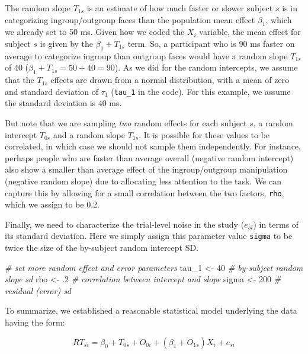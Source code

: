 \documentclass[english,doc,floatsintext]{apa6}
\newenvironment{Shaded}{\begin{snugshade}}{\end{snugshade}}
\newcommand{\CommentTok}[1]{\textcolor[rgb]{0.56,0.35,0.01}{\textit{#1}}}
\newcommand{\DecValTok}[1]{\textcolor[rgb]{0.00,0.00,0.81}{#1}}
\newcommand{\FloatTok}[1]{\textcolor[rgb]{0.00,0.00,0.81}{#1}}
\newcommand{\NormalTok}[1]{#1}
\newcommand{\StringTok}[1]{\textcolor[rgb]{0.31,0.60,0.02}{#1}}
\begin{document}
The random slope \(T_{1s}\) is an estimate of how much faster or slower subject \(s\) is in categorizing ingroup/outgroup faces than the population mean effect \(\beta_1\), which we already set to 50 ms. Given how we coded the \(X_i\) variable, the mean effect for subject \(s\) is given by the \(\beta_1 + T_{1s}\) term. So, a participant who is 90 ms faster on average to categorize ingroup than outgroup faces would have a random slope \(T_{1s}\) of 40 (\(\beta_1 + T_{1s} = 50 + 40 = 90\)). As we did for the random intercepts, we assume that the \(T_{1s}\) effects are drawn from a normal distribution, with a mean of zero and standard deviation of \(\tau_1\) (\texttt{tau\_1} in the code). For this example, we assume the standard deviation is 40 ms.

But note that we are sampling \emph{two} random effects for each subject \(s\), a random intercept \(T_{0s}\) and a random slope \(T_{1s}\). It is possible for these values to be correlated, in which case we should not sample them independently. For instance, perhaps people who are faster than average overall (negative random intercept) also show a smaller than average effect of the ingroup/outgroup manipulation (negative random slope) due to allocating less attention to the task. We can capture this by allowing for a small correlation between the two factors, \texttt{rho}, which we assign to be 0.2.

Finally, we need to characterize the trial-level noise in the study (\(e_{si}\)) in terms of its standard deviation. Here we simply assign this parameter value \texttt{sigma} to be twice the size of the by-subject random intercept SD.

\begin{Shaded}
\begin{Highlighting}[]
\CommentTok{# set more random effect and error parameters}
\NormalTok{tau_}\DecValTok{1}\NormalTok{  <-}\StringTok{  }\DecValTok{40} \CommentTok{# by-subject random slope sd}
\NormalTok{rho    <-}\StringTok{  }\FloatTok{.2} \CommentTok{# correlation between intercept and slope}
\NormalTok{sigma  <-}\StringTok{ }\DecValTok{200} \CommentTok{# residual (error) sd}
\end{Highlighting}
\end{Shaded}

To summarize, we established a reasonable statistical model underlying the data having the form:

\begin{equation}
RT_{si} = \beta_0 + T_{0s} + O_{0i} + \left(\beta_1 + O_{1s}\right) X_i + e_{si}
\end{equation}
\end{document}
